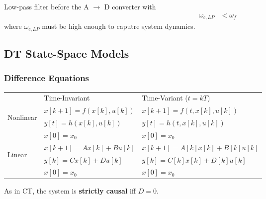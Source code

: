 Low-pass filter before the A $\rightarrow$ D converter with
\noindent\begin{align*}
    \omega_{c,LP} & < \omega_f
\end{align*}
where $\omega_{c,LP}$ must be high enough to caputre system dynamics.
%
%
\subsection{DT State-Space Models}
\subsubsection{Difference Equations}
\renewcommand{\arraystretch}{1.3}
\setlength\tabcolsep{3pt} %
\begin{tabularx}{\linewidth}{@{}lll@{}}
                                                             & Time-Invariant          & Time-Variant ($t = kT$)                \\
    \cmidrule{2-3}
    \multirow{3}{*}{\begin{sideways}Nonlinear\end{sideways}} & $x[k+1] = f(x[k],u[k])$ & $x[k+1] = f(t,x[k],u[k])$    \\
                                                             & $y[t] = h(x[k],u[k])$   & $y[t] = h(t,x[k],u[k])$      \\
                                                             & $x[0]=x_0$              & $x[0]=x_0$                   \\
    \cmidrule{2-3}
    \multirow{3}{*}{\begin{sideways}Linear\end{sideways}}    & $x[k+1] = Ax[k]+Bu[k]$  & $x[k+1] = A[k]x[k]+B[k]u[k]$ \\
                                                             & $y[k] = Cx[k]+Du[k]$    & $y[k] = C[k]x[k]+D[k]u[k]$   \\
                                                             & $x[0] = x_0$            & $x[0]=x_0$                   \\
\end{tabularx}
\renewcommand{\arraystretch}{1}
\setlength\tabcolsep{6pt} %


As in CT, the system is \textbf{strictly causal} iff $D=0$.
